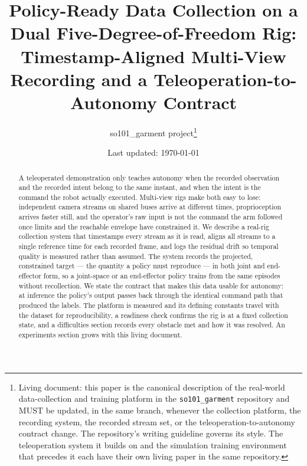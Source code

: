 \documentclass[10pt]{article}
\title{Policy-Ready Data Collection on a Dual Five-Degree-of-Freedom
Rig: Timestamp-Aligned Multi-View Recording and a
Teleoperation-to-Autonomy Contract}
\author{so101\_garment project\thanks{Living document: this paper is the
canonical description of the real-world data-collection and training
platform in the \texttt{so101\_garment} repository and MUST be updated,
in the same branch, whenever the collection platform, the recording
system, the recorded stream set, or the teleoperation-to-autonomy
contract change. The repository's writing guideline governs its style.
The teleoperation system it builds on and the simulation training
environment that precedes it each have their own living paper in the
same repository.}}
\date{Last updated: \today}
\begin{document}
\maketitle

\begin{abstract}
A teleoperated demonstration only teaches autonomy when the recorded
observation and the recorded intent belong to the same instant, and when
the intent is the command the robot actually executed. Multi-view rigs
make both easy to lose: independent camera streams on shared buses arrive
at different times, proprioception arrives faster still, and the operator's
raw input is not the command the arm followed once limits and the
reachable envelope have constrained it. We describe a real-rig collection
system that timestamps every stream as it is read, aligns all streams to a
single reference time for each recorded frame, and logs the residual drift
so temporal quality is measured rather than assumed. The system records
the projected, constrained target --- the quantity a policy must reproduce
--- in both joint and end-effector form, so a joint-space or an
end-effector policy trains from the same episodes without recollection. We
state the contract that makes this data usable for autonomy: at inference
the policy's output passes back through the identical command path that
produced the labels. The platform is measured and its defining constants
travel with the dataset for reproducibility, a readiness check confirms
the rig is at a fixed collection state, and a difficulties section records
every obstacle met and how it was resolved. An experiments section grows
with this living document.
\end{abstract}











\end{document}
